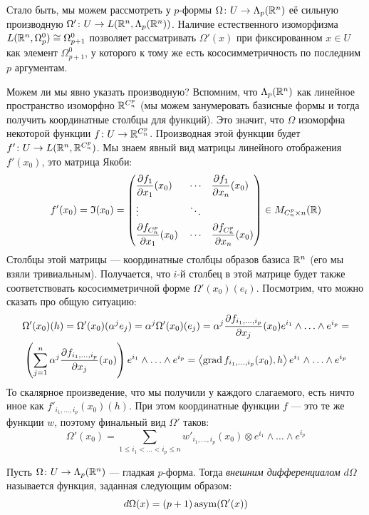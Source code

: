 \begin{note}
	Стало быть, мы можем рассмотреть у $p$-формы $\Omega \colon U \to \Lambda_p(\mathbb{R}^n)$ её сильную производную $\Omega' \colon U \to L(\mathbb{R}^n, \Lambda_p(\mathbb{R}^n))$. Наличие естественного изоморфизма $L(\mathbb{R}^n, \Omega_p^0) \cong \Omega_{p + 1}^0$ позволяет рассматривать $\Omega'(x)$ при фиксированном $x \in U$ как элемент $\Omega_{p + 1}^0$, у которого к тому же есть кососимметричность по последним $p$ аргументам.
	
	Можем ли мы явно указать производную? Вспомним, что $\Lambda_p(\mathbb{R}^n)$ как линейное пространство изоморфно $\mathbb{R}^{C_n^p}$ (мы можем занумеровать базисные формы и тогда получить координатные столбцы для функций). Это значит, что $\Omega$ изоморфна некоторой функции $f \colon U \to \mathbb{R}^{C_n^p}$. Производная этой функции будет $f' \colon U \to L(\mathbb{R}^n, \mathbb{R}^{C_n^p})$. Мы знаем явный вид матрицы линейного отображения $f'(x_0)$, это матрица Якоби:
	\[
		f'(x_0) = \mathfrak{I}(x_0) = \left(\begin{aligned}
			&{\frac{\partial f_1}{\partial x_1}(x_0)} & &\cdots & &{\frac{\partial f_1}{\partial x_n}(x_0)}
			\\
			&\vdots & &\ddots & &
			\\
			&{\frac{\partial f_{C_n^p}}{\partial x_1}(x_0)} & &\cdots & &{\frac{\partial f_{C_n^p}}{\partial x_n}(x_0)}
		\end{aligned}\right) \in M_{C_n^p \times n}(\mathbb{R})
	\]
	Столбцы этой матрицы --- координатные столбцы образов базиса $\mathbb{R}^n$ (его мы взяли тривиальным). Получается, что $i$-й столбец в этой матрице будет также соответствовать кососимметричной форме $\Omega'(x_0)(e_i)$. Посмотрим, что можно сказать про общую ситуацию:
	\begin{multline*}
		\Omega'(x_0)(h) = \Omega'(x_0)(\alpha^j e_j) = \alpha^j\Omega'(x_0)(e_j) = \alpha^j \frac{\partial f_{i_1, \ldots, i_p}}{\partial x_j}(x_0) e^{i_1} \wedge \ldots \wedge e^{i_p} =
		\\
		\left(\sum_{j = 1}^n \alpha^j \frac{\partial f_{i_1, \ldots, i_p}}{\partial x_j} (x_0)\right) e^{i_1} \wedge \ldots \wedge e^{i_p} = \left\langle\operatorname{grad} f_{i_1, \ldots, i_p}(x_0), h\right\rangle e^{i_1} \wedge \ldots \wedge e^{i_p}
	\end{multline*}
	То скалярное произведение, что мы получили у каждого слагаемого, есть ничто иное как $f'_{i_1, \ldots, i_p}(x_0)(h)$. При этом координатные функции $f$ --- это те же функции $w$, поэтому финальный вид $\Omega'$ таков:
	\[
		\Omega'(x_0) = \sum_{1 \le i_1 < \ldots < i_p \le n} w'_{i_1, \ldots, i_p}(x_0) \otimes e^{i_1} \wedge \ldots \wedge e^{i_p}
	\]
\end{note}

\begin{definition}
	Пусть $\Omega \colon U \to \Lambda_p(\mathbb{R}^n)$ --- гладкая $p$-форма. Тогда \textit{внешним дифференциалом} $d\Omega$ называется функция, заданная следующим образом:
	\[
		d\Omega(x) = (p + 1)\operatorname{asym}(\Omega'(x))
	\]
\end{definition}

